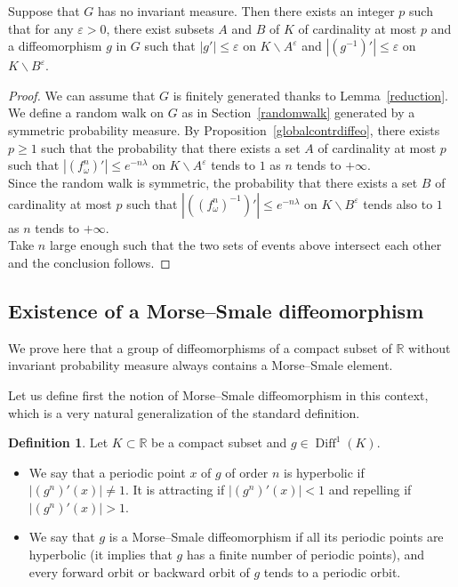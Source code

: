 \documentclass[10pt]{amsart}
\theoremstyle{definition}\newtheorem{defi}[theo]{Definition}\newtheorem{rema}[theo]{Remark}\newtheorem{exam}[theo]{Example}\newtheorem{exem}[theo]{Example}\newtheorem{nota}[theo]{Notation}
\DeclareMathOperator{\Diff}{Diff}
\newcommand{\R}{\mathbb{R}}
\newcommand{\ep}{\varepsilon}
\begin{document}
\begin{coro}\label{smoothcontract}
Suppose that $G$ has no invariant measure. Then there exists an integer $p$ such that for any $\ep>0$, there exist subsets $A$ and $B$ of $K$ of cardinality at most $p$ and a diffeomorphism $g$ in $G$ such that $|g'|\leq \ep$ on $K\backslash A^\ep$ and $|(g^{-1})'|\leq \ep$ on $K\backslash B^\ep$.
\end{coro}

\begin{proof}
We can assume that $G$ is finitely generated thanks to Lemma~\ref{reduction}. We define a random walk on $G$ as in Section~\ref{randomwalk} generated by a symmetric probability measure. By Proposition~\ref{globalcontrdiffeo}, there exists $p \geq 1$ such that the probability that there exists a set $A$ of cardinality at most $p$ such that $|(f_\omega^n)'|\leq e^{-n\lambda}$ on $K\backslash A^\ep$ tends to $1$ as $n$ tends to $+\infty$.\\
Since the random walk is symmetric, the probability that there exists a set $B$ of cardinality at most $p$ such that $|((f_\omega^n)^{-1})'|\leq e^{-n\lambda}$ on $K\backslash B^\ep$ tends also to $1$ as $n$ tends to $+\infty$.\\
Take $n$ large enough such that the two sets of events above intersect each other and the conclusion follows.
\end{proof}

\subsection{Existence of a Morse--Smale diffeomorphism}

We prove here that a group of diffeomorphisms of a compact subset of $\R$ without invariant probability measure always contains a Morse--Smale element.

Let us define first the notion of Morse--Smale diffeomorphism in this context, which is a very natural generalization of the standard definition.

\begin{defi}
Let $K\subset \R$ be a compact subset and $g\in \Diff^1(K)$.
\begin{itemize}
\item We say that a periodic point $x$ of $g$ of order $n$ is hyperbolic if $|(g^n)'(x)|\not=1$. It is attracting if $|(g^n)'(x)|<1$ and repelling if $|(g^n)'(x)|>1$.
\item We say that $g$ is a Morse--Smale diffeomorphism if all its periodic points are hyperbolic (it implies that $g$ has a finite number of periodic points), and every forward orbit or backward orbit of $g$ tends to a periodic orbit.
\end{itemize}
\end{defi}
\end{document}
